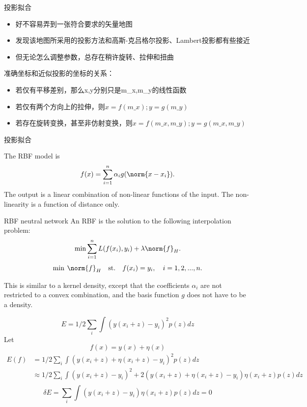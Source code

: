 \documentclass{beamer}
\begin{document}
\begin{frame}{投影拟合}
\begin{itemize}
\item 好不容易弄到一张符合要求的矢量地图
\item 发现该地图所采用的投影方法和高斯-克吕格尔投影、Lambert投影都有些接近
\item 但无论怎么调整参数，总存在稍许旋转、拉伸和扭曲
\end{itemize}
\pause 准确坐标和近似投影的坐标的关系：\pause 
\begin{itemize}
	\item 若仅有平移差别，那么x,y分别只是m\_x,m\_y的线性函数
	\item 若仅有两个方向上的拉伸，则$x = f(m\_x); y = g(m\_y)$
	\item 若存在旋转变换，甚至非仿射变换，则$x = f(m\_x, m\_y); y = g(m\_x, m\_y)$
\end{itemize}
\end{frame}
\begin{frame}{投影拟合}
\begin{center}

\end{center}
The RBF model is
\begin{equation}
f(x)=\sum_{i=1}^n \alpha_i g(\norm{x-x_i}).
\end{equation}
The output is a linear combination of non-linear functions of the input.  The non-linearity is a function of distance only.
\end{frame}
\begin{frame}{RBF neutral network}
An RBF is the solution to the following interpolation problem:
\begin{equation}
\min \sum_{i=1}^n L(f(x_i),y_i) + \lambda \norm{f}_H.
\end{equation}
\begin{equation}
\min \: \norm{f}_H \quad\text{st.}\quad f(x_i)=y_i, \quad i=1,2,...,n.
\end{equation}

This is similar to a kernel density, except that the coefficients $\alpha_i$ are not restricted to a convex combination, and the basis function $g$ does not have to be a density.
\end{frame}
\begin{frame}  
\begin{equation}
E = 1/2 \sum_i \int (y(x_i+z)-y_i)^2 p(z) dz
\end{equation}
Let
\begin{equation}
f(x) = y(x) + \eta(x)
\end{equation}
\begin{align}
E(f) & = 1/2 \sum_i \int (y(x_i+z) + \eta(x_i+z) - y_i)^2 p(z) dz \\
& \approx 1/2 \sum_i \int (y(x_i+z) - y_i)^2 + 2(y(x_i+z)+\eta(x_i+z)-y_i)\eta(x_i+z) p(z) dz \\
\end{align}
\begin{equation}
\delta E = \sum_i \int (y(x_i+z)-y_i)\eta(x_i+z) p(z) dz = 0
\end{equation}
\end{frame}
\end{document}

